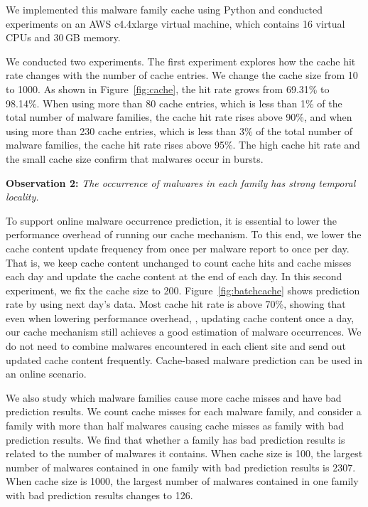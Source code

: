 We implemented this malware family cache using Python
and conducted experiments on an AWS c4.4xlarge virtual machine, 
which contains 16 virtual CPUs and 30\,GB memory.

We conducted two experiments. 
The first experiment explores how the cache hit rate changes with the number of cache entries. 
We change the cache size from 10 to 1000. 
As shown in Figure~\ref{fig:cache}, the hit rate grows from 69.31\% to 98.14\%. 
When using more than 80 cache entries, which is less than 1\% of the total number of malware families, the cache hit rate rises above 90\%, 
and when using more than 230 cache entries, which is less than 3\% of the total number of malware families, 
the cache hit rate rises above 95\%. 
The high cache hit rate and the small cache size confirm that malwares occur in bursts.

{\bf Observation 2:} 
{\em The occurrence of malwares in each family has strong temporal locality.}  

To support online malware occurrence prediction, it is essential to lower the 
performance overhead of running our cache mechanism.
To this end, we lower the cache content update frequency from once per malware report to once per day.
That is, we keep cache content unchanged to count cache hits and cache misses each day and update the cache content at the end of each day.
In this second experiment, we fix the cache size to 200. 
Figure~\ref{fig:batchcache} shows prediction rate by using next day’s data. 
Most cache hit rate is above 70\%,
showing that even when lowering performance overhead, \ie, updating cache content once a day, 
our cache mechanism still achieves a good estimation of malware occurrences.
We do not need to combine malwares encountered in each client site and send out updated cache content frequently. Cache-based malware prediction can be used in an online scenario. 

We also study which malware families cause more cache misses 
and have bad prediction results. 
We count cache misses for each malware family, 
and consider a family with more than half malwares causing cache misses as family with bad prediction results. 
We find that whether a family has bad prediction results is related to the number of malwares it contains. 
When cache size is 100, the largest number of malwares contained in one family with bad prediction results is 2307. 
When cache size is 1000, the largest number of malwares contained in one family with bad prediction results changes to 126. 


